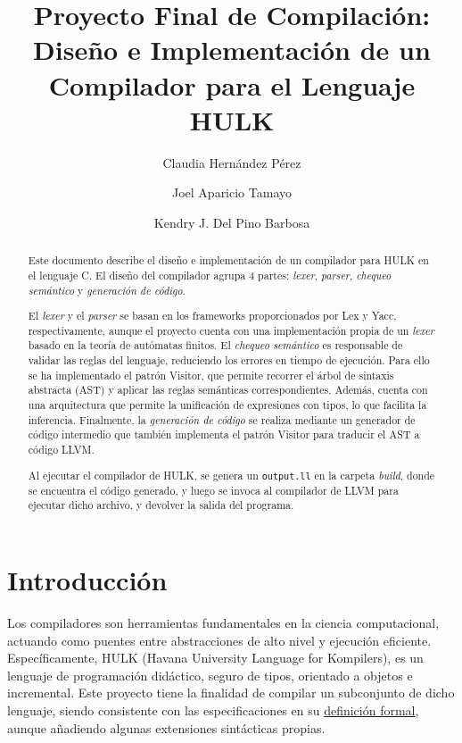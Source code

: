 \documentclass{llncs}
\title{Proyecto Final de Compilación: Diseño e Implementación de un Compilador para el Lenguaje HULK}
\author{Claudia Hernández Pérez \and Joel Aparicio Tamayo \and Kendry J. Del Pino Barbosa}
\institute{Facultad de Matemática y Computación, Universidad de La Habana}
\begin{document}
\maketitle

\begin{abstract}
Este documento describe el diseño e implementación de un compilador para HULK en el lenguaje C. El 
diseño del compilador agrupa 4 partes: \textit{lexer}, \textit{parser}, \textit{chequeo semántico} y \textit{generación de código}.

El \textit{lexer} y el \textit{parser} se basan en los frameworks proporcionados por Lex y Yacc, respectivamente, aunque el proyecto cuenta con
una implementación propia de un \textit{lexer} basado en la teoría de autómatas finitos. El \textit{chequeo semántico} es responsable de validar las reglas del lenguaje,
reduciendo los errores en tiempo de ejecución. Para ello se ha implementado el patrón Visitor, que permite recorrer el árbol de sintaxis abstracta (AST) y aplicar las reglas semánticas correspondientes. Además,
cuenta con una arquitectura que permite la unificación de expresiones con tipos, lo que facilita la inferencia. Finalmente, la \textit{generación de código} se realiza mediante un generador de código intermedio que
también implementa el patrón Visitor para traducir el AST a código LLVM.

Al ejecutar el compilador de HULK, se genera un \texttt{output.ll} en la carpeta \textit{build}, donde se encuentra 
el código generado, y luego se invoca al compilador de LLVM para ejecutar dicho archivo, y devolver la salida del programa.
\vspace{10pt}
\end{abstract}

\section{Introducción}
Los compiladores son herramientas fundamentales en la ciencia computacional, actuando como puentes entre abstracciones de alto nivel y ejecución eficiente. Específicamente, HULK (Havana University Language for Kompilers),
es un lenguaje de programación didáctico, seguro de tipos, orientado a objetos e incremental. Este proyecto tiene la finalidad de compilar un subconjunto de dicho 
lenguaje, siendo consistente con las especificaciones en su \href{https://matcom.in/hulk/guide/intro}{definición formal}, aunque añadiendo algunas extensiones sintácticas propias.
\end{document}
